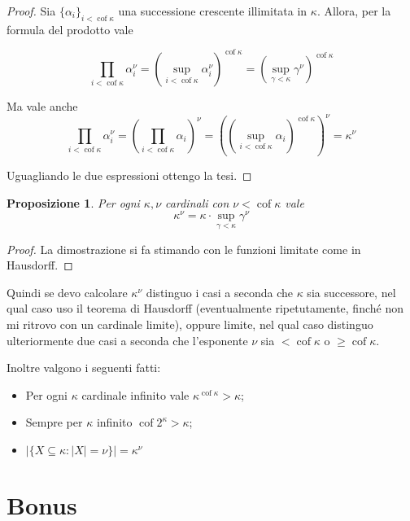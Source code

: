 \documentclass[a4paper,10pt,oneside]{article}
\DeclareMathOperator{\cof}{cof}
\theoremstyle{plain}
\newtheorem{myprop}[mytheorem]{Proposizione}
\theoremstyle{definition}
\theoremstyle{remark}
\begin{document}
\begin{proof}
 Sia $\{\alpha_i\}_{i<\cof\kappa}$ una successione crescente illimitata in $\kappa$. Allora, per la formula del prodotto vale
 
 \[\prod_{i<\cof\kappa} \alpha_i^\nu = \left(\sup_{i<\cof\kappa}\alpha_i^\nu\right)^{\cof\kappa}={\left(\sup_{\gamma<\kappa}\gamma^\nu\right)}^{\cof\kappa}\]
 
 Ma vale anche 
 \[\prod_{i<\cof\kappa} \alpha_i^\nu=\left(\prod_{i<\cof\kappa} \alpha_i\right)^\nu=\left(\left(\sup_{i<\cof\kappa}\alpha_i\right)^{\cof\kappa}\right)^\nu=\kappa^\nu\]
 
 Uguagliando le due espressioni ottengo la tesi.
\end{proof}

\begin{myprop}
 Per ogni $\kappa,\nu$ cardinali con $\nu < \cof \kappa$ vale \[\kappa^\nu=\kappa \cdot \sup_{\gamma<\kappa}\gamma^\nu\]
\end{myprop}
\begin{proof} La dimostrazione si fa stimando con le funzioni limitate come in Hausdorff.
 
\end{proof}


Quindi se devo calcolare $\kappa^\nu$ distinguo i casi a seconda che $\kappa$ sia successore, nel qual caso uso il teorema di Hausdorff (eventualmente ripetutamente, finché non mi ritrovo con un cardinale limite), oppure limite, nel qual caso distinguo ulteriormente due casi a seconda che l'esponente $\nu$ sia $<\cof \kappa$ o $\ge \cof \kappa$.

Inoltre valgono i seguenti fatti: 

\begin{itemize}
\item Per ogni $\kappa$ cardinale infinito vale $\kappa^{\cof\kappa}>\kappa$;
\item Sempre per $\kappa$ infinito $\cof 2^\kappa>\kappa$;

\item $|\{X\subseteq \kappa: |X|=\nu\}|=\kappa^\nu$
\end{itemize}

\section{Bonus}
\end{document}
